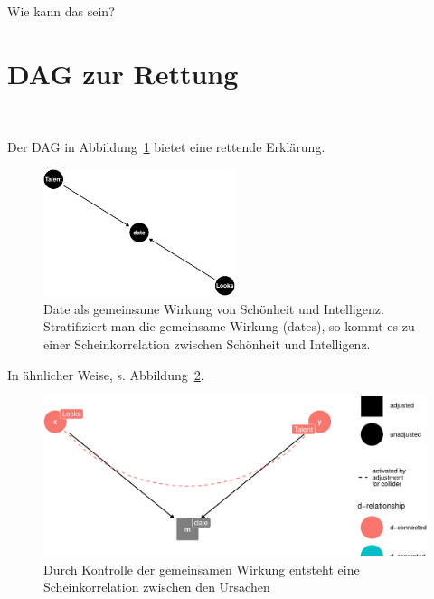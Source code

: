 \documentclass[
  a4paper,
  DIV=11]{scrreprt}
\theoremstyle{definition}
\theoremstyle{remark}
\begin{document}
Wie kann das sein?

\hypertarget{dag-zur-rettung}{%
\section{DAG zur Rettung}\label{dag-zur-rettung}}

🦹 🦸

Der DAG in Abbildung~\ref{fig-coll1-dag} bietet eine rettende Erklärung.

\begin{figure}

{\centering \includegraphics[width=0.5\textwidth,height=\textheight]{./kausal_files/figure-pdf/fig-coll1-dag-1.pdf}

}

\caption{\label{fig-coll1-dag}Date als gemeinsame Wirkung von Schönheit
und Intelligenz. Stratifiziert man die gemeinsame Wirkung (dates), so
kommt es zu einer Scheinkorrelation zwischen Schönheit und Intelligenz.}

\end{figure}

In ähnlicher Weise, s. Abbildung~\ref{fig-coll2-dag}.

\begin{figure}

{\centering \includegraphics{./kausal_files/figure-pdf/fig-coll2-dag-1.pdf}

}

\caption{\label{fig-coll2-dag}Durch Kontrolle der gemeinsamen Wirkung
entsteht eine Scheinkorrelation zwischen den Ursachen}

\end{figure}
\end{document}
